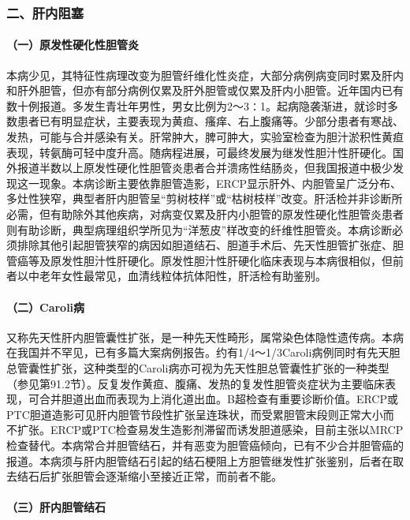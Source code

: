 \subsubsection{二、肝内阻塞}

\paragraph{（一）原发性硬化性胆管炎}

本病少见，其特征性病理改变为胆管纤维化性炎症，大部分病例病变同时累及肝内和肝外胆管，但亦有部分病例仅累及肝外胆管或仅累及肝内小胆管。近年国内已有数十例报道。多发生青壮年男性，男女比例为2～3∶1。起病隐袭渐进，就诊时多数患者已有明显症状，主要表现为黄疸、瘙痒、右上腹痛等。少部分患者有寒战、发热，可能与合并感染有关。肝常肿大，脾可肿大，实验室检查为胆汁淤积性黄疸表现，转氨酶可轻中度升高。随病程进展，可最终发展为继发性胆汁性肝硬化。国外报道半数以上原发性硬化性胆管炎患者合并溃疡性结肠炎，但我国报道中极少发现这一现象。本病诊断主要依靠胆管造影，ERCP显示肝外、内胆管呈广泛分布、多灶性狭窄，典型者肝内胆管呈“剪树枝样”或“枯树枝样”改变。肝活检并非诊断所必需，但有助除外其他疾病，对病变仅累及肝内小胆管的原发性硬化性胆管炎患者则有助诊断，典型病理组织学所见为“洋葱皮”样改变的纤维性胆管炎。本病诊断必须排除其他引起胆管狭窄的病因如胆道结石、胆道手术后、先天性胆管扩张症、胆管癌等及原发性胆汁性肝硬化。原发性胆汁性肝硬化临床表现与本病很相似，但前者以中老年女性最常见，血清线粒体抗体阳性，肝活检有助鉴别。

\paragraph{（二）Caroli病}

又称先天性肝内胆管囊性扩张，是一种先天性畸形，属常染色体隐性遗传病。本病在我国并不罕见，已有多篇大案病例报告。约有1/4～1/3Caroli病例同时有先天胆总管囊性扩张，这种类型的Caroli病亦可视为先天性胆总管囊性扩张的一种类型（参见第91.2节）。反复发作黄疸、腹痛、发热的复发性胆管炎症状为主要临床表现，可合并胆道出血而表现为上消化道出血。B超检查有重要诊断价值。ERCP或PTC胆道造影可见肝内胆管节段性扩张呈连珠状，而受累胆管末段则正常大小而不扩张。ERCP或PTC检查易发生造影剂滞留而诱发胆道感染，目前主张以MRCP检查替代。本病常合并胆管结石，并有恶变为胆管癌倾向，已有不少合并胆管癌的报道。本病须与肝内胆管结石引起的结石梗阻上方胆管继发性扩张鉴别，后者在取去结石后扩张胆管会逐渐缩小至接近正常，而前者不能。

\paragraph{（三）肝内胆管结石}

